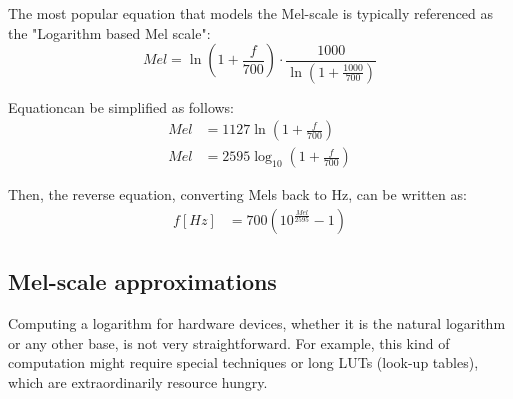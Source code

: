 The most popular equation that models the Mel-scale
is typically referenced as
the "Logarithm based Mel scale"\cite{o1987speech}:
\begin{equation}\label{eq:mel_1}
    Mel = \ln \left( 1 + \frac{f}{700} \right) \cdot \frac{1000}{\ln(1+\frac{1000}{700})} 
\end{equation}

Equation\;[\ref{eq:mel_1}] can be simplified as follows:
\begin{align}
    Mel & = 1127 \ln \left( 1 + \frac{f}{700} \right) \nonumber \\
    Mel & = 2595 \log_{10}\left( 1 + \frac{f}{700} \right)
\end{align}

\bigskip
\bigskip
\bigskip
\bigskip
\bigskip
\bigskip
Then, the reverse equation, converting Mels back to Hz,
can be written as:
\begin{align}
    f[Hz] & = 700 \left( 10^{\frac{Mel}{2595}} -1  \right)
\end{align}


\subsection{Mel-scale approximations}
Computing a logarithm for hardware devices, 
whether it is the natural logarithm or any other base, 
is not very straightforward.
For example, this kind of computation might require special
techniques or long LUTs (look-up tables),
which are extraordinarily resource hungry.

